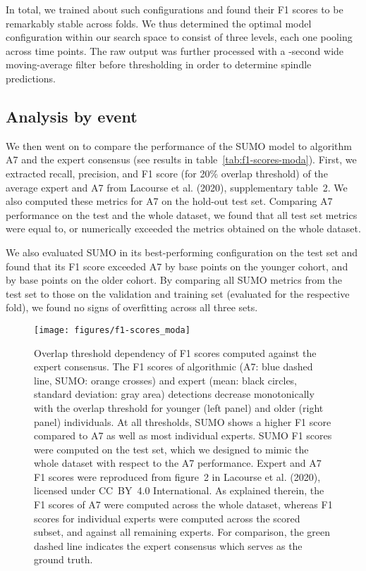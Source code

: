\documentclass[fleqn,twocolumn,10pt]{wlscirep}
\begin{document}
In total, we trained about  such configurations and found their F1 scores
to be remarkably stable across folds.  We thus determined the optimal model
configuration within our search space to consist of three levels, each one
pooling across  time points.
The raw output was further processed with a -second wide moving-average
filter before thresholding in order to determine spindle predictions.

\subsection{Analysis by event}

We then went on to compare the performance of the SUMO model to algorithm A7
and the expert consensus (see results in table~\ref{tab:f1-scores-moda}). First,
we extracted recall, precision, and F1 score (for 20\% overlap threshold) of the
average expert and A7 from Lacourse et al. (2020)\cite{Lacourse2020},
supplementary table~2. We also computed these metrics for A7 on the hold-out
test set.
Comparing A7 performance on the test and the whole dataset, we found that all
test set metrics were equal to, or numerically exceeded the metrics obtained on
the whole dataset.

We also evaluated SUMO in its best-performing configuration on the test set
and found that its F1 score exceeded A7 by  base points on the younger cohort,
and by  base points on the older cohort.
By comparing all SUMO metrics from the test set to those on the validation and
training set (evaluated for the respective fold), we found no signs of
overfitting across all three sets.

\begin{figure*}[t]
	\centering
	\texttt{[image: figures/f1-scores\_moda]}
	\caption{
		Overlap threshold dependency of F1 scores computed against the
		expert consensus.
The F1 scores of algorithmic (A7: blue dashed line, SUMO:
		orange crosses) and expert (mean: black circles, standard
		deviation: gray area) detections decrease monotonically with
		the overlap threshold for younger (left panel) and older (right
		panel) individuals.
At all thresholds, SUMO shows a higher F1 score compared
		to A7 as well as most individual experts.
SUMO F1 scores were computed on the test set, which we designed to
		mimic the whole dataset with respect to the A7 performance.  Expert
		and A7 F1 scores were reproduced from figure~2 in Lacourse et al.
		(2020)\cite{Lacourse2020}, licensed under CC~BY~4.0 International\cite{CCby40}.  As explained therein, the F1 scores of A7
		were computed across the whole dataset, whereas F1 scores for
		individual experts were computed across the scored subset, and against
		all remaining experts.  For comparison, the green dashed line indicates
		the expert consensus which serves as the ground truth.
	}
	\label{fig:f1-scores-moda}
\end{figure*}
\end{document}
